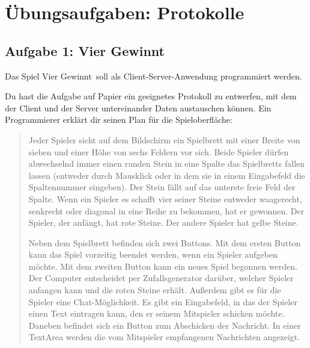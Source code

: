 \clearpage

\rehead[]{\textcolor{lightblue}{AvHG, Inf, My}}
\lohead[]{\textcolor{lightblue}{AvHG, Inf, My}}

\section{Übungsaufgaben: Protokolle}

\subsection{Aufgabe 1: Vier Gewinnt}

Das Spiel \glqq Vier Gewinnt\grqq\ soll als Client-Server-Anwendung programmiert
werden.

Du hast die Aufgabe auf Papier ein geeignetes Protokoll zu entwerfen, mit dem
der Client und der Server untereinander Daten austauschen können. Ein
Programmierer erklärt dir seinen Plan für die Spieloberfläche:

\begin{quotation}
\noindent
Jeder Spieler sieht auf dem Bildschirm ein Spielbrett mit einer Breite von
sieben und einer Höhe von sechs Feldern vor sich. Beide Spieler dürfen
abwechselnd immer einen runden Stein in eine Spalte das Spielbretts fallen
lassen (entweder durch Mausklick oder in dem sie in einem Eingabefeld die
Spaltennummer eingeben). Der Stein fällt auf das unterste freie Feld der
Spalte. Wenn ein Spieler es schafft vier seiner Steine entweder waagerecht,
senkrecht oder diagonal in eine Reihe zu bekommen, hat er gewonnen. Der
Spieler, der anfängt, hat rote Steine. Der andere Spieler hat gelbe Steine.

\noindent
Neben dem Spielbrett befinden sich zwei Buttons. Mit dem ersten Button kann das
Spiel vorzeitig beendet werden, wenn ein Spieler aufgeben möchte. Mit dem
zweiten Button kann ein neues Spiel begonnen werden. Der Computer entscheidet
per Zufallsgenerator darüber, welcher Spieler anfangen kann und die roten
Steine erhält. Außerdem gibt es für die Spieler eine Chat-Möglichkeit. Es gibt
ein Eingabefeld, in das der Spieler einen Text eintragen kann, den er seinem
Mitspieler schicken möchte. Daneben befindet sich ein Button zum Abschicken der
Nachricht. In einer TextArea werden die vom Mitspieler empfangenen
Nachrichten angezeigt.
\end{quotation}

